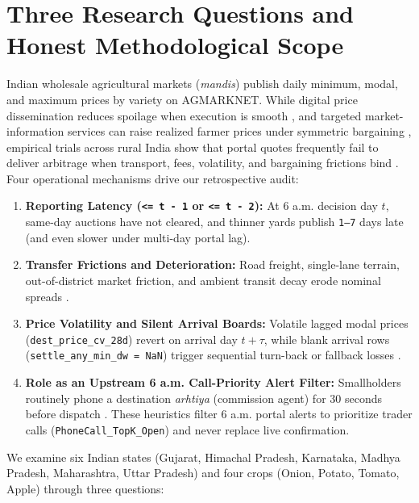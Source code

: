 \documentclass[11pt,a4paper]{article}
\begin{document}
\section{Three Research Questions and Honest Methodological Scope}

Indian wholesale agricultural markets (\textit{mandis}) publish daily minimum, modal, and maximum prices by variety on AGMARKNET. While digital price dissemination reduces spoilage when execution is smooth \citep{jensen2007digital,goyal2010information}, and targeted market-information services can raise realized farmer prices under symmetric bargaining \citep{courtois2015farmer}, empirical trials across rural India show that portal quotes frequently fail to deliver arbitrage when transport, fees, volatility, and bargaining frictions bind \citep{fafchamps2012sms,mitra2018asymmetric,chatterjee2023market}. Four operational mechanisms drive our retrospective audit:

\begin{enumerate}
  \item \textbf{Reporting Latency (\texttt{<= t - 1} or \texttt{<= t - 2}):} At 6 a.m. decision day $t$, same-day auctions have not cleared, and thinner yards publish \texttt{1--7} days late (and even slower under multi-day portal lag).
  \item \textbf{Transfer Frictions and Deterioration:} Road freight, single-lane terrain, out-of-district market friction, and ambient transit decay erode nominal spreads \citep{baulch1997transfer,nabcons2022phl}.
  \item \textbf{Price Volatility and Silent Arrival Boards:} Volatile lagged modal prices (\texttt{dest\_price\_cv\_28d}) revert on arrival day $t + \tau$, while blank arrival rows (\texttt{settle\_any\_min\_dw = NaN}) trigger sequential turn-back or fallback losses \citep{deka2026missing}.
  \item \textbf{Role as an Upstream 6 a.m. Call-Priority Alert Filter:} Smallholders routinely phone a destination \textit{arhtiya} (commission agent) for 30 seconds before dispatch \citep{jensen2007digital,ziegler2019fresh}. These heuristics filter 6 a.m. portal alerts to prioritize trader calls (\texttt{PhoneCall\_TopK\_Open}) and never replace live confirmation.
\end{enumerate}

We examine six Indian states (Gujarat, Himachal Pradesh, Karnataka, Madhya Pradesh, Maharashtra, Uttar Pradesh) and four crops (Onion, Potato, Tomato, Apple) through three questions:
\end{document}
